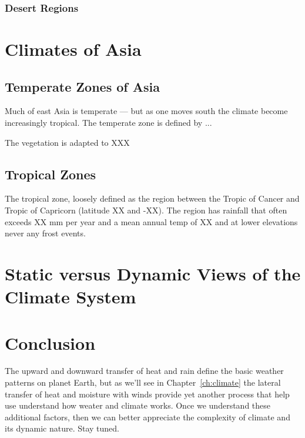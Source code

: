\subsubsection{Desert Regions}

\section{Climates of Asia}

\subsection{Temperate Zones of Asia}

Much of east Asia is temperate --- but as one moves south the climate become increasingly tropical. The temperate zone is defined by ... 

The vegetation is adapted to XXX 

\subsection{Tropical Zones}

The tropical zone, loosely defined as the region between the Tropic of Cancer and Tropic of Capricorn (latitude XX and -XX). The region has rainfall that often exceeds XX mm per year and a mean annual temp of XX and at lower elevations never any frost events. 

\section{Static versus Dynamic Views of the Climate System}


\section{Conclusion}

The upward and downward transfer of heat and rain define the basic weather patterns on planet Earth, but as we'll see in Chapter~\ref{ch:climate} the lateral transfer of heat and moisture with winds provide yet another process that help use understand how weater and climate works. Once we understand these additional factors, then we can better appreciate the complexity of climate and its dynamic nature.  Stay tuned.